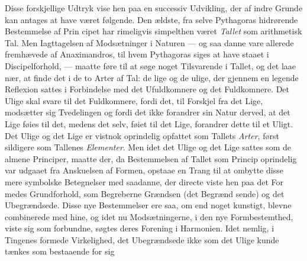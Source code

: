 \documentclass[12pt,a4paper]{book}
\begin{document}
Disse forskjellige Udtryk vise hen paa en successiv Udvikling,
der af indre Grunde kan antages at have været følgende. Den
ældste, fra selve Pythagoras hidrørende Bestemmelse af Prin\-%
cipet har rimeligvis simpelthen været \emph{Tallet} som arithmetisk
Tal. Men Iagttagelsen af Modsætninger i Naturen --- og saa\-%
danne vare allerede fremhævede af Anaximandros, til hvem
Pythagoras siges at have staaet i Discipelforhold, --- maatte
føre til at søge noget Tilsvarende i Tallet, og det laae nær,
at finde det i de to Arter af Tal: de lige og de ulige, der
gjennem en legende Reflexion sattes i Forbindelse med det
Ufuldkomnere og det Fuldkomnere. Det Ulige skal svare til
det Fuldkomnere, fordi det, til Forskjel fra det Lige, modsætter
sig Tvedelingen og fordi det ikke forandrer sin Natur derved,
at det Lige føies til det, medens det selv, føiet til det Lige,
forandrer dette til et Uligt. Det Ulige og det Lige er vistnok
oprindelig opfattet som Tallets \emph{Arter}, først sildigere som
Tallenes \emph{Elementer}. Men idet det Ulige og det Lige sattes
som de almene Principer, maatte der, da Bestemmelsen af
Tallet som Princip oprindelig var udgaaet fra Anskuelsen af
Formen, opstaae en Trang til at ombytte disse mere symbolske
Betegnelser med saadanne, der directe viste hen paa det For\-%
medes Grundforhold, som Begreberne Grændsen (det Begrænd\-%
sende) og det Ubegrændsede. Disse nye Bestemmelser ere
saa, om end noget kunstigt, blevne combinerede med hine,
og idet nu Modsætningerne, i den nye Formbestemthed, viste
sig som forbundne, søgtes deres Forening i Harmonien. Idet
nemlig, i Tingenes formede Virkelighed, det Ubegrændsede
ikke som det Ulige kunde tænkes som bestaaende for sig
\end{document}

